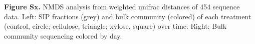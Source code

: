 \textbf{Figure Sx.} NMDS analysis from weighted unifrac distances of 454 sequence data. Left: SIP fractions (grey) and bulk community (colored) of each treatment (control, circle; cellulose, triangle; xylose, square) over time. Right: Bulk community sequencing colored by day.   